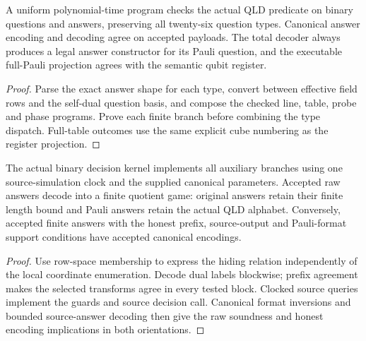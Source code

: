 \begin{lemma}
\label{lem:intro-binary-pauli-predicate}
\leanok
A uniform polynomial-time program checks the actual QLD predicate on binary
questions and answers, preserving all twenty-six question types. Canonical
answer encoding and decoding agree on accepted payloads. The total decoder
always produces a legal answer constructor for its Pauli question, and the
executable full-Pauli projection agrees with the semantic qubit register.
\end{lemma}
\begin{proof}
\leanok
Parse the exact answer shape for each type, convert between effective field
rows and the self-dual question basis, and compose the checked line, table,
probe and phase programs. Prove each finite branch before combining the
type dispatch. Full-table outcomes use the same explicit cube numbering as
the register projection.
\end{proof}

\begin{lemma}
\label{lem:intro-quotient-kernel}
\leanok
The actual binary decision kernel implements all auxiliary branches using
one source-simulation clock and the supplied canonical parameters. Accepted
raw answers decode into a finite quotient game: original answers retain
their finite length bound and Pauli answers retain the actual QLD alphabet.
Conversely, accepted finite answers with the honest prefix, source-output
and Pauli-format support conditions have accepted canonical encodings.
\end{lemma}
\begin{proof}
\leanok
Use row-space membership to express the hiding relation independently of
the local coordinate enumeration. Decode dual labels blockwise; prefix
agreement makes the selected transforms agree in every tested block.
Clocked source queries implement the guards and source decision call.
Canonical format inversions and bounded source-answer decoding then give
the raw soundness and honest encoding implications in both orientations.
\end{proof}


